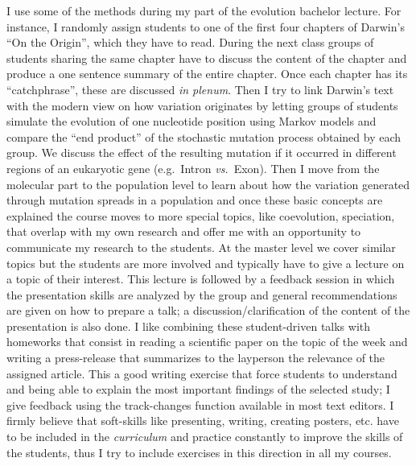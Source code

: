 \documentclass[a4paper,11pt]{article}
\begin{document}
I use some of the methods during my part of the evolution bachelor lecture. For instance, I randomly assign students to one of the first four chapters of Darwin's ``On the Origin'', which they have to read. During the next class groups of students sharing the same chapter have to discuss the content of the chapter and produce a one sentence summary of the entire chapter. Once each chapter has its ``catchphrase'', these are discussed \emph{in plenum}. Then I try to link Darwin's text with the modern view on how variation originates by letting groups of students simulate the evolution of one nucleotide position using Markov models and compare the ``end product'' of the stochastic mutation process obtained by each group. We discuss the effect of the resulting mutation if it occurred in different regions of an eukaryotic gene (e.g.~Intron \emph{vs.}~Exon). Then I move from the molecular part to the population level to learn about how the variation generated through mutation spreads in a population and once these basic concepts are explained the course moves to more special topics, like coevolution, speciation, that overlap with my own research and offer me with an opportunity to communicate my research to the students. At the master level we cover similar topics but the students are more involved and typically have to give a lecture on a topic of their interest. This lecture is followed by a feedback session in which the presentation skills are analyzed by the group and general recommendations are given on how to prepare a talk; a discussion/clarification of the content of the presentation is also done. I like combining these student-driven talks with homeworks that consist in reading a scientific paper on the topic of the week and writing a press-release that summarizes to the layperson the relevance of the assigned article. This a good writing exercise that force students to understand and being able to explain the most important findings of the selected study; I give feedback using the track-changes function available in most text editors. I firmly believe that soft-skills like presenting, writing, creating posters, etc. have to be included in the \emph{curriculum} and practice constantly to improve the skills of the students, thus I try to include exercises in this direction in all my courses.\\
\end{document}
